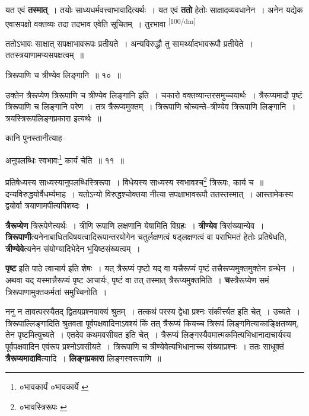 \documentclass[article,12pt,a4paper]{memoir}
\begin{document}
	  \pstart यत एवं \textbf{तस्मात्} । तयोः साध्यधर्मवत्त्वाभावादित्यर्थः । यत एवं \textbf{ततो} हेतोः साक्षादव्यवधानेन । अनेन यद्येक एवासपक्षो वक्तव्यः तदा तदभाव एवेति सूचितम् । तुरभावा  \leavevmode\textsuperscript{\rmlatinfont\tiny [100/dm]} 
	  
	ततोऽभावः साक्षात् सपक्षाभावरूपः प्रतीयते । अन्यविरुद्धौ तु सामर्थ्यादभावरूपौ प्रतीयेते । ततस्त्रयाणामप्यसपक्षत्वम् ॥ 
	  
	त्रिरूपाणि च त्रीण्येव लिङ्गानि ॥ १० ॥ 
	  
	उक्तेन त्रैरूप्येण त्रिरूपाणि च त्रीण्येव लिङ्गानि इति । चकारो वक्तव्यान्तरसमुच्चयार्थः । त्रैरूप्यमादौ पृष्टं त्रिरूपाणि च लिङ्गानि परेण । तत्र त्रैरूप्यमुक्तम् । त्रिरूपाणि चोच्यन्ते--त्रीण्येव त्रिरूपाणि लिङ्गानि । त्रयस्त्रिरूपलिङ्गप्रकारा इत्यर्थः ॥ 
	  
	कानि पुनस्तानीत्याह-- 
	  
	अनुपलब्धिः स्वभावः\footnote{०भावकार्यं \cite{dp-edE} ०भावकार्ये \cite{dp-msD} \cite{dp-msB} \cite{dp-edP} \cite{dp-edH} \cite{dp-edN}} कार्यं चेति ॥ ११ ॥ 
	  
	प्रतिषेध्यस्य साध्यस्यानुपलब्धिस्त्रिरूपा । विधेयस्य साध्यस्य स्वभावश्च\footnote{०भावस्त्रिरूपः \cite{dp-msA} \cite{dp-msB} \cite{dp-msD} \cite{dp-edP} \cite{dp-edH} \cite{dp-edE} \cite{dp-edN}} त्रिरूपः, कार्य च ॥ दन्यविरुद्धयोर्वैधर्म्यमाह । यतोऽन्यो विरुद्धश्चोक्तया नीत्या सपक्षाभावरूपौ ततस्तस्मात् । आस्तामेकस्य द्वयोर्वा त्रयाणामपीत्यपिशब्दः ।
	\pend
      

	  \pstart \textbf{त्रैरूप्येण} त्रिरूपेणेत्यर्थः । त्रीणि रूपाणि लक्षणानि येषामिति विग्रहः । \textbf{त्रीण्येव} त्रिसंख्यान्येव । \textbf{त्रिरूपाणी}त्यनेनाबाधितविषयत्वादिरूपान्तरयोगेन चतुर्लक्षणत्वं षड्लक्षणत्वं वा पराभिमतं हेतोः प्रतिषेधति, \textbf{त्रीण्येवे}त्यनेन संयोग्यादिभेदेन भूयिष्ठसंख्यत्वम् ।
	\pend
      

	  \pstart \textbf{पृष्ट} इति पाठे त्वाचार्य इति शेषः । यत् त्रैरूप्यं पृष्टो यद् वा यत्त्रैरूप्यं पृष्टं तत्त्रैरूप्यमुक्तमुक्तेन ग्रन्थेन । अथवा यद् यस्मात्त्रैरूप्यं पृष्ट आचार्यः, पृष्टं वा तत् तस्मात् त्रैरूप्यमुक्तमिति । \textbf{च}स्त्रैरूप्येण समं त्रिरूपाणामुक्तकर्मतां समुच्चिनोति ।
	\pend
      

	  \pstart ननु न तावत्परस्यैतद् द्वितयप्रश्नवाक्यं श्रुतम् । तत्कथं परस्य द्वेधा प्रश्नः संकीर्त्त्यत इति चेत् । उच्यते । त्रिरूपाल्लिङ्गादिति श्रुतवता पूर्वपक्षवादिनाऽवश्यं किं तत् त्रैरूप्यं कियच्च त्रिरूपं लिङ्गमित्याकाङ्क्षितव्यम्, तेन पृष्टमित्युच्यते । एतदेव कथमवसीयत इति चेत् । त्रैरूप्यं लिङ्गस्यैवमात्मकमित्यभिधानादाचार्यस्य पूर्वपक्षवादिन एवंरूप प्रश्नोऽवसीयते । त्रिरूपाणि च त्रीण्येवेत्यभिधानाच्च संख्याप्रश्नः । ततः साधूक्तं \textbf{त्रैरूप्यमादावि}त्यादि । \textbf{लिङ्गप्रकारा} लिङ्गस्वरूपाणि ॥
	\pend
      
\end{document}
